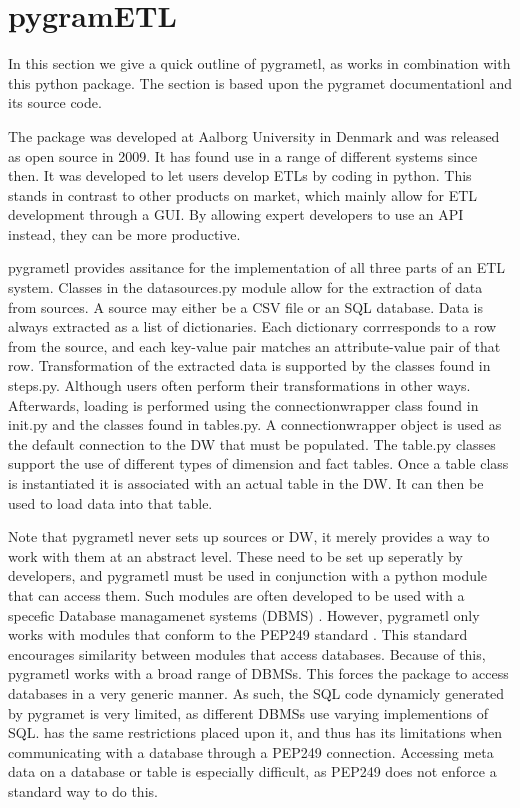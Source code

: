 \section{pygramETL}\label{sect:pygrametl}
In this section we give a quick outline of pygrametl, as \FW{} works in combination with this python package. The section is based upon the pygramet documentationl and its source code\cite{pygramSource}.   

The package was developed at Aalborg University in Denmark and was released as open source in 2009. It has found use in a range of different systems since then. It was developed to let users develop ETLs by coding in python. This stands in contrast to other products on market, which mainly allow for ETL development through a GUI. By allowing expert developers to use an API instead, they can be more productive.

pygrametl provides assitance for the implementation of all three parts of an ETL system. Classes in the datasources.py module allow for the extraction of data from sources. A source may either be a CSV file or an SQL database. Data is always extracted as a list of dictionaries. Each dictionary corrresponds to a row from the source, and each key-value pair matches an attribute-value pair of that row. Transformation of the extracted data is supported by the classes found in steps.py. Although users often perform their transformations in other ways. Afterwards, loading is performed using the connectionwrapper class found in init.py and the classes found in tables.py. A connectionwrapper object is used as the default connection to the DW that must be populated.  The table.py classes support the use of different types of dimension and fact tables. Once a table class is instantiated it is associated with an actual table in the DW. It can then be used to load data into that table. 

Note that pygrametl never sets up sources or DW, it merely provides a way to work with them at an abstract level. These need to be set up seperatly by developers, and pygrametl must be used in conjunction with a python module that can access them. Such modules are often developed to be used with a specefic  Database managamenet systems (DBMS) . However, pygrametl only works with modules that conform to the PEP249 standard \cite{pep249}. This standard encourages similarity between modules that access databases. Because of this, pygrametl works with a broad range of DBMSs. This forces the package to access databases in a very generic manner. As such, the SQL code dynamicly generated by pygramet is very limited, as different DBMSs use varying implementions of SQL. \FW{} has the same restrictions placed upon it, and thus has its limitations when communicating with a database through a PEP249 connection. Accessing meta data on a database or table is especially difficult, as PEP249 does not enforce a standard way to do this. 
    
